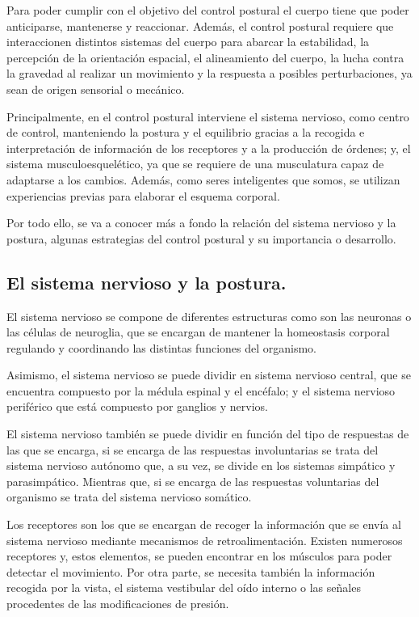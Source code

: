 Para poder cumplir con el objetivo del control postural el cuerpo tiene que poder anticiparse, mantenerse y reaccionar. Además, el control postural requiere que interaccionen distintos sistemas del cuerpo para abarcar la estabilidad, la percepción de la orientación espacial, el alineamiento del cuerpo, la lucha contra la gravedad al realizar un movimiento y la respuesta a posibles perturbaciones, ya sean de origen sensorial o mecánico.

Principalmente, en el control postural interviene el sistema nervioso, como centro de control, manteniendo la postura y el equilibrio gracias a la recogida e interpretación de información de los receptores y a la producción de órdenes; y, el sistema musculoesquelético, ya que se requiere de una musculatura capaz de adaptarse a los cambios. Además, como seres inteligentes que somos, se utilizan experiencias previas para elaborar el esquema corporal.

Por todo ello, se va a conocer más a fondo la relación del sistema nervioso y la postura, algunas estrategias del control postural y su importancia o desarrollo.


\subsection{El sistema nervioso y la postura.} 
El sistema nervioso se compone de diferentes estructuras como son las neuronas o las células de neuroglia, que se encargan de mantener la homeostasis corporal regulando y coordinando las distintas funciones del organismo.

Asimismo, el sistema nervioso se puede dividir en sistema nervioso central, que se encuentra compuesto por la médula espinal y el encéfalo; y el sistema nervioso periférico que está compuesto por ganglios y nervios.

El sistema nervioso también se puede dividir en función del tipo de respuestas de las que se encarga, si se encarga de las respuestas involuntarias se trata del sistema nervioso autónomo que, a su vez, se divide en los sistemas simpático y parasimpático. Mientras que, si se encarga de las respuestas voluntarias del organismo se trata del sistema nervioso somático.

Los receptores son los que se encargan de recoger la información que se envía al sistema nervioso mediante mecanismos de retroalimentación. Existen numerosos receptores y, estos elementos, se pueden encontrar en los músculos para poder detectar el movimiento. Por otra parte, se necesita también la información recogida por la vista, el sistema vestibular del oído interno o las señales procedentes de las modificaciones de presión.

